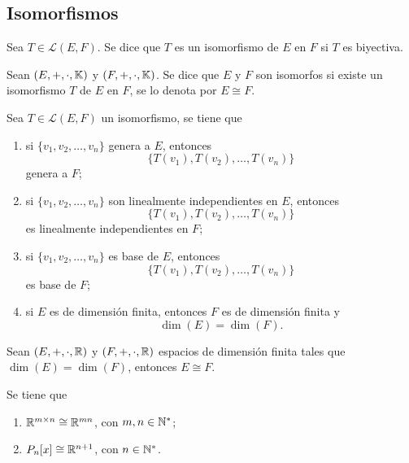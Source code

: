 \documentclass[a4,11pt]{aleph-notas}
\begin{document}
\subsection{Isomorfismos}


\begin{defi}[Isomorfismo]
    Sea $T \in \mathcal{L}(E,F)$. Se dice que $T$ es un isomorfismo de $E$ en $F$ si $T$ es biyectiva.
\end{defi}

\begin{defi}
    Sean $(E,+,\cdot,\mathbb{K})$ y $(F,+,\cdot,\mathbb{K})$. Se dice que $E$ y $F$ son isomorfos si existe un isomorfismo $T$ de $E$ en $F$, se lo denota por $E \cong F$.
\end{defi}

\begin{teo}
    Sea $T \in \mathcal{L}(E,F)$ un isomorfismo, se tiene que
    \begin{enumerate}
    \item 
        si $\{v_1, v_2, \ldots, v_n\}$ genera a $E$, entonces 
        \[
            \{T(v_1), T(v_2), \ldots, T(v_n)\}
        \]
        genera a $F$;
    \item 
        si $\{v_1, v_2, \ldots, v_n\}$ son linealmente independientes en $E$, entonces 
        \[
            \{T(v_1), T(v_2), \ldots, T(v_n)\}
        \] 
        es linealmente independientes en $F$;
    \item 
        si $\{v_1, v_2, \ldots, v_n\}$ es base de $E$, entonces
        \[
            \{T(v_1), T(v_2), \ldots, T(v_n)\}
        \]
        es base de $F$; 
    \item 
        si $E$ es de dimensión finita, entonces $F$ es de dimensión finita y 
        \[
            \dim(E) = \dim(F).
        \]
    \end{enumerate}
\end{teo} 

\begin{teo}
    Sean $(E,+,\cdot,\mathbb{R})$ y $(F,+,\cdot,\mathbb{R})$ espacios de dimensión finita tales que $\dim(E) = \dim(F)$, entonces $E \cong F$.
\end{teo}

\begin{teo}
    Se tiene que
    \begin{enumerate}
        \item $\mathbb{R}^{m\times n} \cong \mathbb{R}^{mn}$, con $m,n\in\mathbb{N}^*$;
        \item $P_n[x] \cong \mathbb{R}^{n+1}$, con $n\in\mathbb{N}^*$.
    \end{enumerate}
\end{teo}
\end{document}
